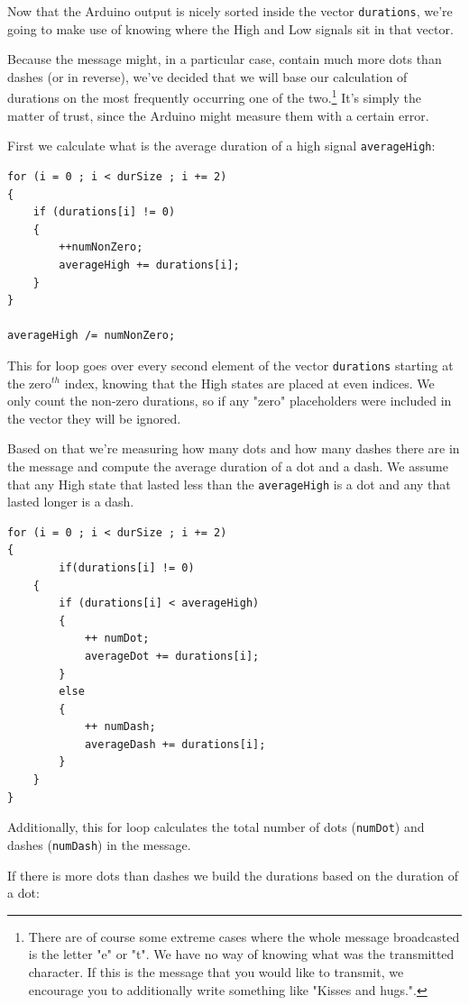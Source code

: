 \documentclass[12pt]{report}
\begin{document}
Now that the Arduino output is nicely sorted inside the vector \texttt{durations}, we're going to make use of knowing where the High and Low signals sit in that vector.  

Because the message might, in a particular case, contain much more dots than dashes (or in reverse), we've decided that we will base our calculation of durations on the most frequently occurring one of the two.\footnote{There are of course some extreme cases where the whole message broadcasted is the letter "e" or "t". We have no way of knowing what was the transmitted character. If this is the message that you would like to transmit, we encourage you to additionally write something like "Kisses and hugs.".} It's simply the matter of trust, since the Arduino might measure them with a certain error.

First we calculate what is the average duration of a high signal \texttt{averageHigh}:

\begin{lstlisting}
for (i = 0 ; i < durSize ; i += 2)
{
	if (durations[i] != 0)
	{
		++numNonZero;
		averageHigh += durations[i];
	}
}

averageHigh /= numNonZero;
\end{lstlisting}

This for loop goes over every second element of the vector \texttt{durations} starting at the zero$^{th}$ index, knowing that the High states are placed at even indices. We only count the non-zero durations, so if any "zero" placeholders were included in the vector they will be ignored.

Based on that we're measuring how many dots and how many dashes there are in the message and compute the average duration of a dot and a dash. We assume that any High state that lasted less than the \texttt{averageHigh} is a dot and any that lasted longer is a dash.

\begin{lstlisting}
for (i = 0 ; i < durSize ; i += 2)
{
     	if(durations[i] != 0)
	{
		if (durations[i] < averageHigh)
		{
			++ numDot;
			averageDot += durations[i];
		}
		else
		{
			++ numDash;
			averageDash += durations[i];
		}
	}
}
\end{lstlisting}

Additionally, this for loop calculates the total number of dots (\texttt{numDot}) and dashes (\texttt{numDash}) in the message.

If there is more dots than dashes we build the durations based on the duration of a dot:
\end{document}
